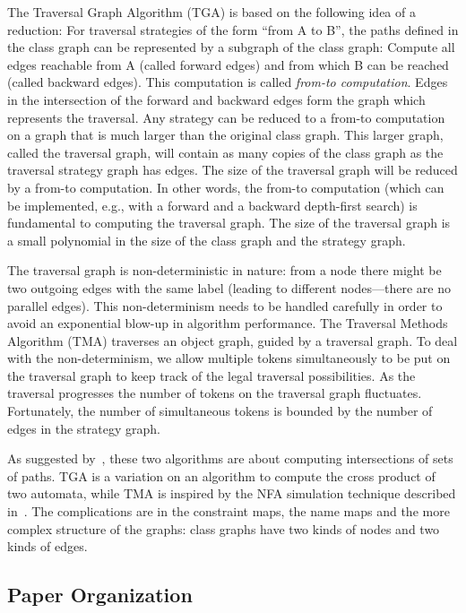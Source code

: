 The Traversal Graph Algorithm (TGA) is based on the following idea of
a reduction: For traversal strategies of the form ``{\sf from A to
B}'', the paths defined in the class graph can be represented by a
subgraph of the class graph: Compute all edges reachable from {\sf A}
(called forward edges) and from which {\sf B} can be reached (called
backward edges). This computation is called {\em from-to
computation}. Edges in the intersection of the forward and backward
edges form the graph which represents the traversal.  Any strategy can
be reduced to a from-to computation on a graph that is much larger
than the original class graph. This larger graph, called the traversal
graph, will contain as many copies of the class graph as the traversal
strategy graph has edges.  The size of the traversal graph will be
reduced by a from-to computation.  In other words, the from-to
computation (which can be implemented, e.g., with a forward and a
backward depth-first search) is fundamental to computing the traversal
graph. The size of the traversal graph is a small polynomial in the
size of the class graph and the strategy graph.

The traversal graph is non-deterministic in nature: from a node there
might be two outgoing edges with the same label (leading to different
nodes---there are no parallel edges).  This non-determinism needs to
be handled carefully in order to avoid an exponential blow-up in
algorithm performance.  The Traversal Methods Algorithm (TMA)
traverses an object graph, guided by a traversal graph. To deal with
the non-determinism, we allow multiple tokens simultaneously to be put
on the traversal graph to keep track of the legal traversal
possibilities. As the traversal progresses the number of tokens on the
traversal graph fluctuates. Fortunately, the number of simultaneous
tokens is bounded by the number of edges in the strategy graph.

As suggested by~\cite{gener-comp-j:jens-boaz-karl,Smaragdakis}, these
two algorithms are about computing intersections of sets of paths.
TGA is a variation on an algorithm to compute the cross product of two
automata, while TMA is inspired by the NFA simulation technique
described in~\cite{dragon-nfa-sim}.  The complications are in the
constraint maps, the name maps and the more complex structure of the
graphs: class graphs have two kinds of nodes and two kinds of edges.


\subsection{Paper Organization}

